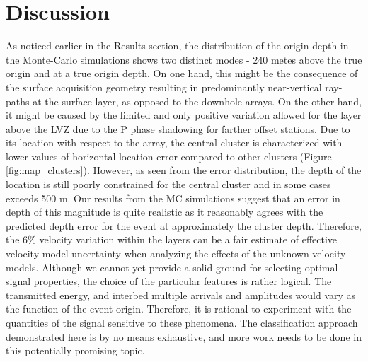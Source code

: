 \documentclass[letterpaper,11pt]{article}
\begin{document}
\section*{Discussion}
As noticed earlier in the Results section, the distribution of the origin depth in the Monte-Carlo simulations shows two distinct modes - 240 metes above the true origin and at a true origin depth. On one hand, this might be the consequence of the surface acquisition geometry resulting in predominantly near-vertical ray-paths at the surface layer, as opposed to the downhole arrays. On the other hand, it might be caused by the limited and only positive variation allowed for the layer above the LVZ due to the P phase shadowing for farther offset stations. Due to its location with respect to the array, the central cluster is characterized with lower values of horizontal location error compared to other clusters (Figure \ref{fig:map_clusters}). However, as seen from the error distribution, the depth of the location is still poorly constrained for the central cluster and in some cases exceeds 500 m. Our results from the MC simulations suggest that an error in depth of this magnitude is quite realistic as it reasonably agrees with the predicted depth error for the event at approximately the cluster depth. Therefore, the 6\% velocity variation within the layers can be a fair estimate of effective velocity model uncertainty when analyzing the effects of the unknown velocity models.
Although we cannot yet provide a solid ground for selecting optimal signal properties, the choice of the particular features is rather logical. The transmitted energy, and interbed multiple arrivals and amplitudes would vary as the function of the event origin. Therefore, it is rational to experiment with the quantities of the signal sensitive to these phenomena. The classification approach demonstrated here is by no means exhaustive, and more work needs to be done in this potentially promising topic.



\end{document}

